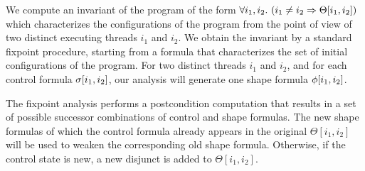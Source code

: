 We compute an invariant of the
program %
of the form %
$\forall i_1, i_2. \ (i_1 \neq i_2 \Rightarrow \Theta[i_1,i_2])$ %
which characterizes the configurations of the program from the point
of view of two distinct executing threads $i_1$ and $i_2$. %
We obtain the invariant by a standard fixpoint procedure, starting
from a formula that characterizes the set of initial configurations of
the program.
%
For two distinct threads $i_1$ and $i_2$, and for each control formula
$\sigma[i_1,i_2]$, our analysis will generate one shape formula
$\phi[i_1,i_2]$.
%

The fixpoint analysis performs a postcondition computation that
results in a set of possible successor combinations of control and
shape formulas. %
The new shape formulas of which the control formula already appears in
the original $\Theta[i_1,i_2]$ will be used to weaken the
corresponding old shape formula. Otherwise, if
the control state is new, a new disjunct is added to
$\Theta[i_1,i_2]$.




